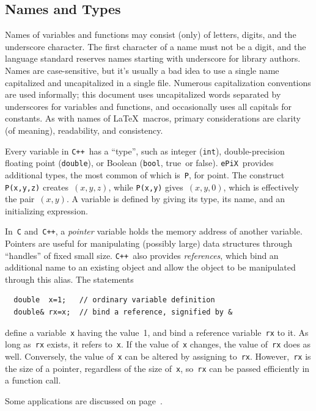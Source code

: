 \documentclass[12pt,letterpaper]{book}
\newcommand{\code}[1]{\texttt{#1}}
\newcommand{\ePiX}{\code{ePiX}}
\newcommand{\CXX}{\code{C++}}
\newcommand{\texicomment}{}
\newcommand{\texicommentend}{}
\newcommand{\teximath}[1]{$#1$}
\begin{document}
\subsection{Names and Types}

Names of variables and functions may consist (only) of letters,
digits, and the underscore character. The first character of a name
must not be a digit, and the language standard reserves names starting
with underscore for library authors. Names are case-sensitive, but
it's usually a bad idea to use a single name capitalized and
uncapitalized in a single file. Numerous capitalization conventions
are used informally; this document uses uncapitalized words separated
by underscores for variables and functions, and occasionally uses all
capitals for constants. As with names of \LaTeX\ macros, primary
considerations are clarity (of meaning), readability, and consistency.

Every variable in \CXX\ has a ``type'',
such as integer (\code{int}), double-precision floating point
(\code{double}), or Boolean (\code{bool}, true~or false).  \ePiX\ 
provides additional types, the most common of which is~\code{P}, for
point. The construct \code{P(x,y,z)} creates~\teximath{(x,y,z)}, while
\code{P(x,y)} gives~\teximath{(x,y,0)}, which is effectively the
pair~\teximath{(x,y)}. A variable is defined by giving its type, its
name, and an initializing expression.

In~\code{C} and~\CXX, a \emph{pointer} variable holds the memory
address of another variable. Pointers are useful for manipulating
(possibly large) data structures through ``handles'' of fixed small
size. \CXX\ also provides \emph{references}, which bind an additional
name to an existing object and allow the object to be manipulated
through this alias. The statements
\begin{verbatim}
  double  x=1;   // ordinary variable definition
  double& rx=x;  // bind a reference, signified by &
\end{verbatim}
define a variable~\code{x} having the value~1, and bind a reference
variable~\code{rx} to it. As long as~\code{rx} exists, it refers
to~\code{x}. If the value of~\code{x} changes, the value of~\code{rx}
does as well. Conversely, the value of~\code{x} can be altered by
assigning to~\code{rx}. However,~\code{rx} is the size of a pointer,
regardless of the size of~\code{x}, so~\code{rx} can be passed
efficiently in a function call.
\texicomment
Some applications are discussed on page~\pageref{references}.
\texicommentend
\end{document}
